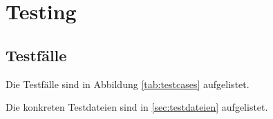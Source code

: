 
\section{Testing}
\label{sec:testing}

\subsection{Testfälle}
\label{ssec:testfaelle}

Die Testfälle sind in Abbildung \ref{tab:testcases} aufgelistet.

Die konkreten Testdateien sind in \ref{sec:testdateien} aufgelistet.

